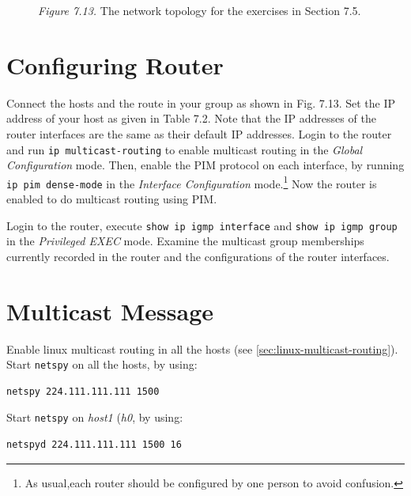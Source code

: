 \documentclass{../UTNetLab}
\begin{document}
    \begin{figure}[H]
        \centering
        \caption{\textit{Figure 7.13.} The network topology for the exercises in Section 7.5.}
        \label{fig:7.13}
    \end{figure}

\section{Configuring Router}
\label{sec:config-router}
    Connect the hosts and the route in your group as shown in Fig. 7.13. Set the IP address of your host as given in Table 7.2. Note that the IP addresses of the router interfaces are the same as their default IP addresses.
    Login to the router and run \lstinline{ip multicast-routing} to enable multicast routing in the \textit{Global Configuration} mode.
    Then, enable the PIM protocol on each interface, by running \lstinline{ip pim dense-mode} in the \textit{Interface Configuration} mode.\footnote{As usual,each router should be configured by one person to avoid confusion.} Now the router is enabled to do multicast routing using PIM.

    Login to the router, execute \lstinline{show ip igmp interface} and \lstinline{show ip igmp group} in the \textit{Privileged EXEC} mode.
    Examine the multicast group memberships currently recorded in the router and the configurations of the router interfaces.

\section{Multicast Message}
    Enable linux multicast routing in all the hosts (see \autoref{sec:linux-multicast-routing}).\\
    Start \lstinline{netspy} on all the hosts, by using:
    \begin{lstlisting}
netspy 224.111.111.111 1500
    \end{lstlisting}
    Start \lstinline{netspy} on \textit{host1} (\textit{h0}, by using:
    \begin{lstlisting}
netspyd 224.111.111.111 1500 16
    \end{lstlisting}
    
\end{document}
